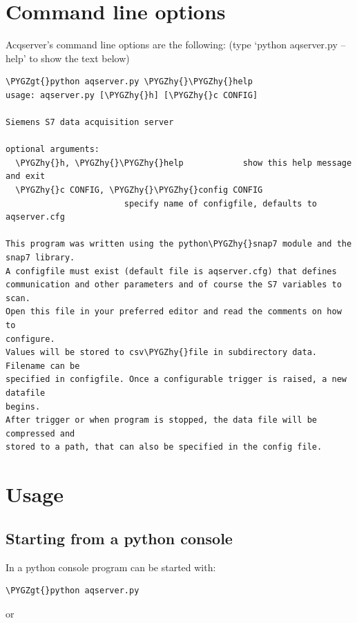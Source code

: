 \documentclass[a4paper,10pt,english]{sphinxmanual}
\def\PYGZgt{\char`\>}
\def\PYGZhy{\char`\-}
\begin{document}
\chapter{Command line options}
\label{options::doc}\label{options:command-line-options}
Acqserver's  command line options are the following:
(type `python aqserver.py --help' to show the text below)

\begin{Verbatim}[commandchars=\\\{\}]
\PYGZgt{}python aqserver.py \PYGZhy{}\PYGZhy{}help
usage: aqserver.py [\PYGZhy{}h] [\PYGZhy{}c CONFIG]

Siemens S7 data acquisition server

optional arguments:
  \PYGZhy{}h, \PYGZhy{}\PYGZhy{}help            show this help message and exit
  \PYGZhy{}c CONFIG, \PYGZhy{}\PYGZhy{}config CONFIG
                        specify name of configfile, defaults to aqserver.cfg

This program was written using the python\PYGZhy{}snap7 module and the snap7 library.
A configfile must exist (default file is aqserver.cfg) that defines
communication and other parameters and of course the S7 variables to scan.
Open this file in your preferred editor and read the comments on how to
configure.
Values will be stored to csv\PYGZhy{}file in subdirectory data. Filename can be
specified in configfile. Once a configurable trigger is raised, a new datafile
begins.
After trigger or when program is stopped, the data file will be compressed and
stored to a path, that can also be specified in the config file.
\end{Verbatim}


\chapter{Usage}
\label{usage:usage}\label{usage::doc}

\section{Starting from a python console}
\label{usage:starting-from-a-python-console}
In a python console program can be started with:

\begin{Verbatim}[commandchars=\\\{\}]
\PYGZgt{}python aqserver.py
\end{Verbatim}

or
\end{document}
